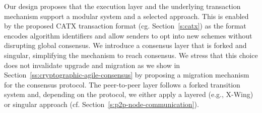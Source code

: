 Our design proposes that the execution layer and the underlying transaction mechanism support a modular system and a selected approach.
This is enabled by the proposed CATX transaction format (cg. Section~\ref{s:catx}) as the format encodes algorithm identifiers and allow senders to opt into new schemes without disrupting global consensus.
We introduce a consensus layer that is forked and singular, simplifying the mechanism to reach consensus. 
We stress that this choice does not invalidate upgrade and migration as we show in Section~\ref{ss:cryptographic-agile-consensus} by proposing a migration mechanism for the consensus protocol. 
The peer-to-peer layer follows a forked transition system and, depending on the protocol, we either apply a layered (e.g., X-Wing) or singular approach (cf. Section~\ref{s:p2p-node-communication}).  
% 











